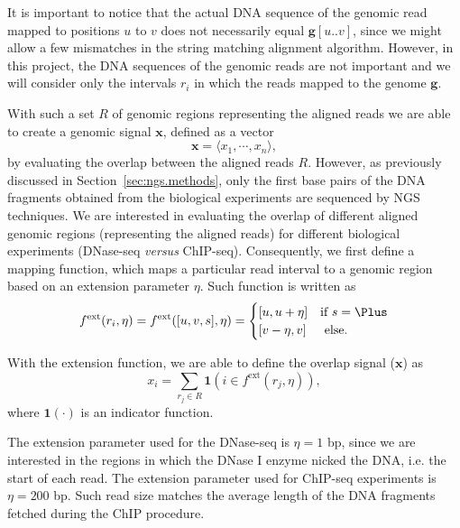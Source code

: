 It is important to notice that the actual DNA sequence of the genomic read mapped to positions $u$ to $v$ does not necessarily equal $\mathbf{g}[u..v]$, since we might allow a few mismatches in the string matching alignment algorithm. However, in this project, the DNA sequences of the genomic reads are not important and we will consider only the intervals ${r}_{i}$ in which the reads mapped to the genome $\mathbf{g}$.

With such a set $R$ of genomic regions representing the aligned reads we are able to create a genomic signal $\mathbf{x}$, defined as a vector
\begin{equation}
  \label{eq:raw.signal}
  \mathbf{x} = \langle {x}_{1}, \cdots, {x}_{n} \rangle,
\end{equation}
by evaluating the overlap between the aligned reads $R$. However, as previously discussed in Section~\ref{sec:ngs.methods}, only the first base pairs of the DNA fragments obtained from the biological experiments are sequenced by NGS techniques. We are interested in evaluating the overlap of different aligned genomic regions (representing the aligned reads) for different biological experiments (DNase-seq \emph{versus} ChIP-seq). Consequently, we first define a mapping function, which maps a particular read interval to a genomic region based on an extension parameter $\eta$. Such function is written as
\begin{equation}
  \label{eq:raw.signal.extension}
  {f}^{\text{ext}}({r}_{i}, \eta) = {f}^{\text{ext}}([u, v, s], \eta) =
  \begin{cases}
    [u,u+\eta] & \text{if } s = \Plus \\
    [v-\eta,v] & \text{ else.}
  \end{cases}
\end{equation}

With the extension function, we are able to define the overlap signal ($\mathbf{x}$) as
\begin{equation}
  \label{eq:raw.signal.overlap}
  {x}_{i} = \sum_{{r}_{j} \in R} \mathbf{1}\left( i \in {f}^{\text{ext}}({r}_{j}, \eta) \right),
\end{equation}
where ${\mathbf{1}}(\cdot)$ is an indicator function.

The extension parameter used for the DNase-seq is $\eta = 1$ bp, since we are interested in the regions in which the DNase I enzyme nicked the DNA, i.e. the start of each read. The extension parameter used for ChIP-seq experiments is $\eta = 200$ bp. Such read size matches the average length of the DNA fragments fetched during the ChIP procedure.

